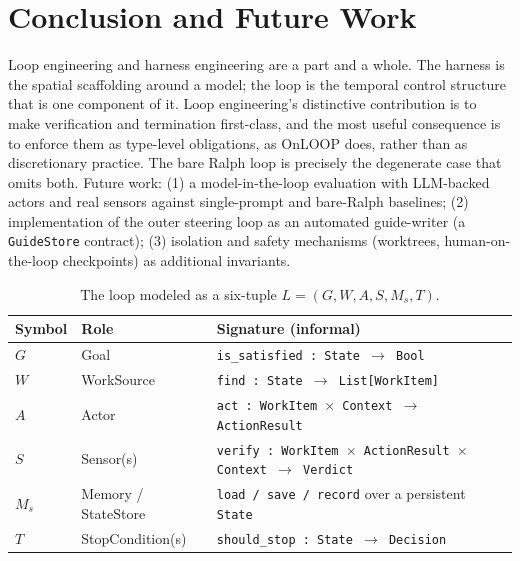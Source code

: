 \documentclass[10pt,twocolumn,letterpaper]{article}
\begin{document}
\section{Conclusion and Future Work}
Loop engineering and harness engineering are a part and a whole. The harness is
the spatial scaffolding around a model; the loop is the temporal control
structure that is one component of it. Loop engineering's distinctive
contribution is to make verification and termination first-class, and the most
useful consequence is to enforce them as type-level obligations, as OnLOOP does,
rather than as discretionary practice. The bare Ralph loop is precisely the
degenerate case that omits both. Future work: (1) a model-in-the-loop evaluation
with LLM-backed actors and real sensors against single-prompt and bare-Ralph
baselines; (2) implementation of the outer steering loop as an automated
guide-writer (a \texttt{GuideStore} contract); (3) isolation and safety
mechanisms (worktrees, human-on-the-loop checkpoints) as additional invariants.

\begin{table}[t]
\centering
\caption{The loop modeled as a six-tuple $L = (G, W, A, S, M_s, T)$.}
\label{tab:tuple}
\small
\begin{tabular}{@{}>{\bfseries}l l l@{}}
\toprule
Symbol & Role & Signature (informal) \\
\midrule
$G$   & Goal               & \texttt{is\_satisfied : State $\rightarrow$ Bool} \\
$W$   & WorkSource         & \texttt{find : State $\rightarrow$ List[WorkItem]} \\
$A$   & Actor              & \texttt{act : WorkItem $\times$ Context $\rightarrow$ ActionResult} \\
$S$   & Sensor(s)          & \texttt{verify : WorkItem $\times$ ActionResult $\times$ Context $\rightarrow$ Verdict} \\
$M_s$ & Memory / StateStore& \texttt{load / save / record} over a persistent \texttt{State} \\
$T$   & StopCondition(s)   & \texttt{should\_stop : State $\rightarrow$ Decision} \\
\bottomrule
\end{tabular}
\end{table}
\end{document}
